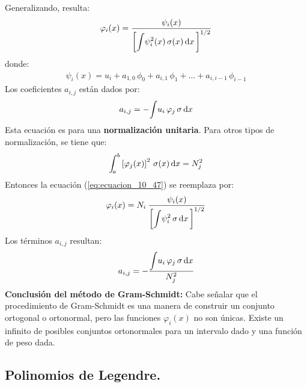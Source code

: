 \documentclass[12pt]{article}
\def\scaleint#1{\vcenter{\hbox{\scaleto[3ex]{\displaystyle\int}{#1}}}}
\def\bs{\mkern-12mu}
\numberwithin{equation}{section}
\begin{document}
Generalizando, resulta:
\begin{align}
\varphi_{i} (x) = \dfrac{\psi_{i} (x)}{ \bigg[ \displaystyle \scaleint{5ex} \psi_{i}^{2} (x) \, \sigma (x) \dd{x} \bigg]^{1/2}}
\label{eq:ecuacion_10_47}
\end{align}
donde:
\begin{align}
\psi_{i}(x) = u_{i} + a_{1, 0} \, \phi_{0} + a_{i, 1} \, \phi_{1} + \ldots + a_{i, i-1} \, \phi_{i-1}
\label{eq:ecuacion_10_48}
\end{align}
Los coeficientes $a_{i, j}$ están dados por:
\begin{align}
a_{i, j} = - \scaleint{5ex} u_{i} \, \varphi_{j} \, \sigma  \dd{x}
\label{eq:ecuacion_10_49}
\end{align}
Esta ecuación es para una \textbf{normalización unitaria}. Para otros tipos de normalización, se tiene que:
\begin{align*}
\scaleint{5ex}_{\bs a}^{b} \left[ \varphi_{j} (x) \right]^{2} \, \sigma (x) \dd{x} =  N_{j}^{2}
\end{align*}
Entonces la ecuación (\ref{eq:ecuacion_10_47}) se reemplaza por:
\begin{align}
\varphi_{i} (x) =  N_{i} \: \dfrac{\psi_{i} (x)}{ \bigg[ \displaystyle \scaleint{5ex} \psi_{i}^{2} \, \sigma \dd{x} \bigg]^{1/2}}
\label{eq:ecuacion_10_47a}
\end{align}
Los términos $a_{i,j}$ resultan:
\begin{align}
a_{i, j} = - \dfrac{ \displaystyle \scaleint{5ex} u_{i} \, \varphi_{j} \, \sigma \dd{x}}{N_{j}^{2}}
\label{eq:ecuacion_10_49a}
\end{align}
\textbf{Conclusión del método de Gram-Schmidt: } Cabe señalar que el procedimiento de Gram-Schmidt es una  manera de construir un conjunto ortogonal o ortonormal, pero las funciones $\varphi_{i}(x)$ no son únicas. Existe un infinito de posibles conjuntos ortonormales para un intervalo dado y una función de peso dada.

\subsection{Polinomios de Legendre.}
\end{document}
